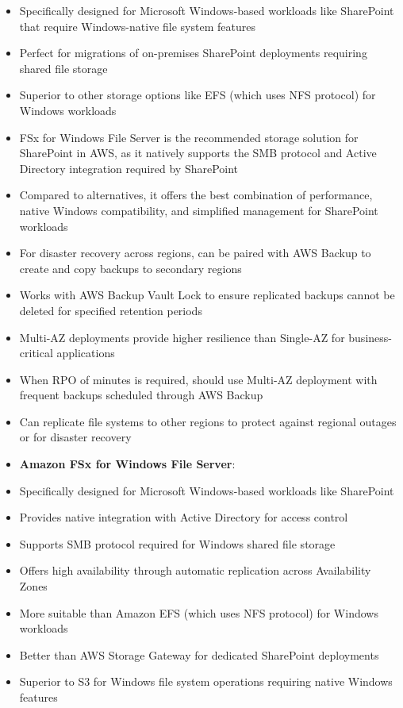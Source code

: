 \documentclass[11pt,a4paper]{report}
\begin{document}
\begin{itemize}
\begin{itemize}
  \item Specifically designed for Microsoft Windows-based workloads like SharePoint that require Windows-native file system features
  \item Perfect for migrations of on-premises SharePoint deployments requiring shared file storage
  \item Superior to other storage options like EFS (which uses NFS protocol) for Windows workloads
  \item FSx for Windows File Server is the recommended storage solution for SharePoint in AWS, as it natively supports the SMB protocol and Active Directory integration required by SharePoint
  \item Compared to alternatives, it offers the best combination of performance, native Windows compatibility, and simplified management for SharePoint workloads
  \item For disaster recovery across regions, can be paired with AWS Backup to create and copy backups to secondary regions
  \item Works with AWS Backup Vault Lock to ensure replicated backups cannot be deleted for specified retention periods
  \item Multi-AZ deployments provide higher resilience than Single-AZ for business-critical applications
  \item When RPO of minutes is required, should use Multi-AZ deployment with frequent backups scheduled through AWS Backup
  \item Can replicate file systems to other regions to protect against regional outages or for disaster recovery
  \item \textbf{Amazon FSx for Windows File Server}:
  \item Specifically designed for Microsoft Windows-based workloads like SharePoint
  \item Provides native integration with Active Directory for access control
  \item Supports SMB protocol required for Windows shared file storage
  \item Offers high availability through automatic replication across Availability Zones
  \item More suitable than Amazon EFS (which uses NFS protocol) for Windows workloads
  \item Better than AWS Storage Gateway for dedicated SharePoint deployments
  \item Superior to S3 for Windows file system operations requiring native Windows features

\end{itemize}
\end{itemize}
\end{document}
